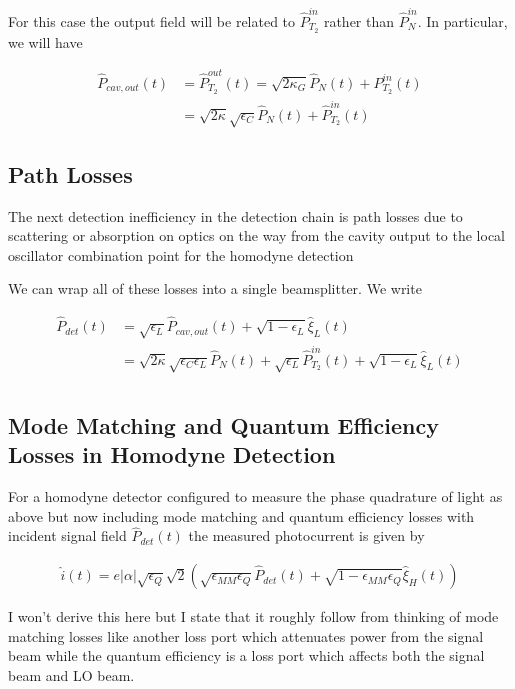 \documentclass[12pt]{article}
\begin{document}
For this case the output field will be related to $\hat{P}_{T_2}^{in}$ rather than $\hat{P}_N^{in}$. In particular, we will have

\begin{align}
\hat{P}_{cav,out}(t) &= \hat{P}_{T_2}^{out}(t) = \sqrt{2\kappa_G}\hat{P}_N(t) + P_{T_2}^{in}(t)\\
&= \sqrt{2\kappa}\sqrt{\epsilon_C} \hat{P}_N(t) + \hat{P}_{T_2}^{in}(t)
\end{align}

\subsection{Path Losses}

The next detection inefficiency in the detection chain is path losses due to scattering or absorption on optics on the way from the cavity output to the local oscillator combination point for the homodyne detection

We can wrap all of these losses into a single beamsplitter. We write

\begin{align}
\hat{P}_{det}(t) &= \sqrt{\epsilon_L}\hat{P}_{cav,out}(t) + \sqrt{1-\epsilon_L}\hat{\xi}_L(t)\\
&= \sqrt{2\kappa}\sqrt{\epsilon_C\epsilon_L}\hat{P}_N(t) + \sqrt{\epsilon_L}\hat{P}_{T_2}^{in}(t) + \sqrt{1-\epsilon_L}\hat{\xi}_L(t)\\
\end{align}

\subsection{Mode Matching and Quantum Efficiency Losses in Homodyne Detection}

For a homodyne detector configured to measure the phase quadrature of light as above but now including mode matching and quantum efficiency losses with incident signal field $\hat{P}_{det}(t)$ the measured photocurrent is given by

\begin{align}
\hat{i}(t) = e|\alpha|\sqrt{\epsilon_Q}\sqrt{2}\left(\sqrt{\epsilon_{MM}\epsilon_Q}\hat{P}_{det}(t) + \sqrt{1-\epsilon_{MM}\epsilon_Q}\hat{\xi}_H(t) \right)
\end{align}

I won't derive this here but I state that it roughly follow from thinking of mode matching losses like another loss port which attenuates power from the signal beam while the quantum efficiency is a loss port which affects both the signal beam and LO beam.
\end{document}
